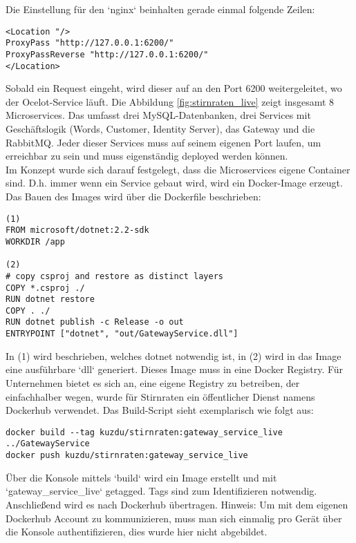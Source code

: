 Die Einstellung für den `nginx` beinhalten gerade einmal folgende Zeilen: 

\begin{verbatim}
<Location "/>
ProxyPass "http://127.0.0.1:6200/"
ProxyPassReverse "http://127.0.0.1:6200/"
</Location>
\end{verbatim}

Sobald ein Request eingeht, wird dieser auf an den Port 6200 weitergeleitet, wo der Ocelot-Service läuft. Die Abbildung \ref{fig:stirnraten_live} zeigt insgesamt 8 Microservices. Das umfasst drei MySQL-Datenbanken, drei Services mit Geschäftslogik (Words, Customer, Identity Server), das Gateway und die RabbitMQ. Jeder dieser Services muss auf seinem eigenen Port laufen, um erreichbar zu sein und muss eigenständig deployed werden können.\\

Im Konzept wurde sich darauf festgelegt, dass die Microservices eigene Container sind. D.h. immer wenn ein Service gebaut wird, wird ein Docker-Image erzeugt. Das Bauen des Images wird über die Dockerfile beschrieben: 

\begin{verbatim}
(1)
FROM microsoft/dotnet:2.2-sdk
WORKDIR /app

(2)
# copy csproj and restore as distinct layers
COPY *.csproj ./
RUN dotnet restore
COPY . ./
RUN dotnet publish -c Release -o out
ENTRYPOINT ["dotnet", "out/GatewayService.dll"]
\end{verbatim}

In (1) wird beschrieben, welches dotnet notwendig ist, in (2) wird in das Image eine ausführbare `dll` generiert. Dieses Image muss in eine Docker Registry. Für Unternehmen bietet es sich an, eine eigene Registry zu betreiben, der einfachhalber wegen, wurde für Stirnraten ein öffentlicher Dienst namens Dockerhub verwendet. Das Build-Script sieht exemplarisch wie folgt aus: 

\begin{verbatim}
docker build --tag kuzdu/stirnraten:gateway_service_live ../GatewayService
docker push kuzdu/stirnraten:gateway_service_live
\end{verbatim}

Über die Konsole mittels `build` wird ein Image erstellt und mit `gateway\_service\_live` getagged. Tags sind zum Identifizieren notwendig. Anschließend wird es nach Dockerhub übertragen. Hinweis: Um mit dem eigenen Dockerhub Account zu kommunizieren, muss man sich einmalig pro Gerät über die Konsole authentifizieren, dies wurde hier nicht abgebildet. \\

